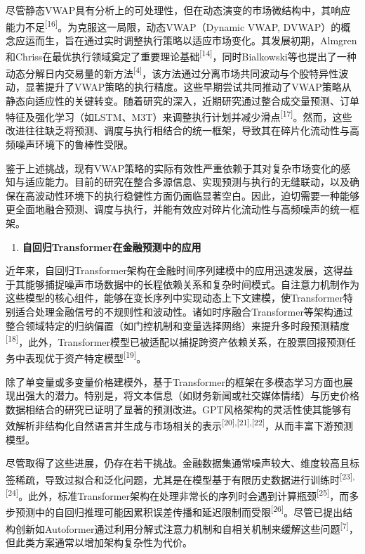 \documentclass[UTF8]{ctexart}
\begin{document}
尽管静态VWAP具有分析上的可处理性，但在动态演变的市场微结构中，其响应能力不足\textsuperscript{{[}16{]}}。为克服这一局限，动态VWAP（Dynamic
VWAP,
DVWAP）的概念应运而生，旨在通过实时调整执行策略以适应市场变化。其发展初期，Almgren和Chriss在最优执行领域奠定了重要理论基础\textsuperscript{{[}14{]}}，同时Bialkowski等也提出了一种动态分解日内交易量的新方法\textsuperscript{{[}4{]}}，该方法通过分离市场共同波动与个股特异性波动，显著提升了VWAP策略的执行精度。这些早期尝试共同推动了VWAP策略从静态向适应性的关键转变。随着研究的深入，近期研究通过整合成交量预测、订单特征及强化学习（如LSTM、M3T）来调整执行计划并减少滑点\textsuperscript{{[}17{]}}。然而，这些改进往往缺乏将预测、调度与执行相结合的统一框架，导致其在碎片化流动性与高频噪声环境下的鲁棒性受限。

鉴于上述挑战，现有VWAP策略的实际有效性严重依赖于其对复杂市场变化的感知与适应能力。目前的研究在整合多源信息、实现预测与执行的无缝联动，以及确保在高波动性环境下的执行稳健性方面仍面临显著空白。因此，迫切需要一种能够更全面地融合预测、调度与执行，并能有效应对碎片化流动性与高频噪声的统一框架。

\begin{enumerate}
\def\labelenumi{\arabic{enumi}.}
\setcounter{enumi}{1}
\item
  \textbf{自回归Transformer在金融预测中的应用}
\end{enumerate}

近年来，自回归Transformer架构在金融时间序列建模中的应用迅速发展，这得益于其能够捕捉噪声市场数据中的长程依赖关系和复杂时间模式。自注意力机制作为这些模型的核心组件，能够在变长序列中实现动态上下文建模，使Transformer特别适合处理金融信号的不规则性和波动性。诸如时序融合Transformer等架构通过整合领域特定的归纳偏置（如门控机制和变量选择网络）来提升多时段预测精度\textsuperscript{{[}18{]}}，此外，Transformer模型已被适配以捕捉跨资产依赖关系，在股票回报预测任务中表现优于资产特定模型\textsuperscript{{[}19{]}}。

除了单变量或多变量价格建模外，基于Transformer的框架在多模态学习方面也展现出强大的潜力。特别是，将文本信息（如财务新闻或社交媒体情绪）与历史价格数据相结合的研究已证明了显著的预测改进。GPT风格架构的灵活性使其能够有效解析非结构化自然语言并生成与市场相关的表示\textsuperscript{{[}20{]},{[}21{]},{[}22{]}}，从而丰富下游预测模型。

尽管取得了这些进展，仍存在若干挑战。金融数据集通常噪声较大、维度较高且标签稀疏，导致过拟合和泛化问题，尤其是在模型基于有限历史数据进行训练时\textsuperscript{{[}23{]},{[}24{]}}。此外，标准Transformer架构在处理非常长的序列时会遇到计算瓶颈\textsuperscript{{[}25{]}}，而多步预测中的自回归推理可能因累积误差传播和延迟限制而受限\textsuperscript{{[}26{]}}。尽管已提出结构创新如Autoformer通过利用分解式注意力机制和自相关机制来缓解这些问题\textsuperscript{{[}7{]}}，但此类方案通常以增加架构复杂性为代价。
\end{document}
